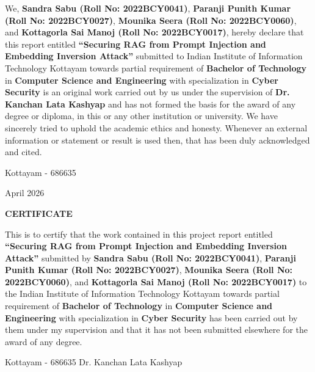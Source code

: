 \documentclass[11pt,a4paper]{report}
\theoremstyle{plain}
\theoremstyle{definition}
\theoremstyle{remark}
\begin{document}
\noindent We, \textbf{Sandra Sabu (Roll No: 2022BCY0041)}, \textbf{Paranji Punith Kumar (Roll No: 2022BCY0027)}, \textbf{Mounika Seera (Roll No: 2022BCY0060)}, and \textbf{Kottagorla Sai Manoj (Roll No: 2022BCY0017)}, hereby declare that this report entitled \textbf{``Securing RAG from Prompt Injection and Embedding Inversion Attack''} submitted to Indian Institute of Information Technology Kottayam towards partial requirement of {\bf Bachelor of Technology} in \textbf{Computer Science and Engineering} with specialization in \textbf{Cyber Security} is an original work carried out by us under the supervision of \textbf{Dr. Kanchan Lata Kashyap} and has not formed the basis for the award of any degree or diploma, in this or any other institution or university. We have sincerely tried to uphold the academic ethics and honesty. Whenever an external information or statement or result is used then, that has been duly acknowledged and cited.

\vspace{2.5cm}

\noindent Kottayam - 686635 \hfill {}

\noindent April 2026
\hfill {}

\hfill {}

\hfill {}
\clearpage

 \setcounter{page}{3}
\begin{center}
{\large{\bf{CERTIFICATE}}}
\end{center}

\noindent This is to certify that the work contained in this project report entitled \textbf{``Securing RAG from Prompt Injection and Embedding Inversion Attack''} submitted by \textbf{Sandra Sabu (Roll No: 2022BCY0041)}, \textbf{Paranji Punith Kumar (Roll No: 2022BCY0027)}, \textbf{Mounika Seera (Roll No: 2022BCY0060)}, and \textbf{Kottagorla Sai Manoj (Roll No: 2022BCY0017)} to the Indian Institute of Information Technology Kottayam towards partial requirement of {\bf Bachelor of Technology} in \textbf{Computer Science and Engineering} with specialization in \textbf{Cyber Security} has been carried out by them under my supervision and that it has not been submitted elsewhere for the award of any degree.

\vspace{4cm}

\noindent Kottayam - 686635 \hfill Dr. Kanchan Lata Kashyap
\end{document}
